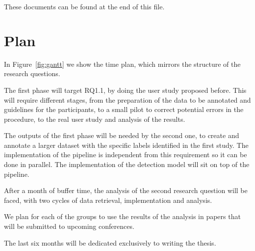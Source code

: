 These documents can be found at the end of this file.






\section{Plan}


In Figure~\ref{fig:gantt} we show the time plan, which mirrors the structure of the research questions.

The first phase will target RQ1.1, by doing the user study proposed before. This will require different stages, from the preparation of the data to be annotated and guidelines for the participants, to a small pilot to correct potential errors in the procedure, to the real user study and analysis of the results.

The outputs of the first phase will be needed by the second one, to create and annotate a larger dataset with the specific labels identified in the first study. The implementation of the pipeline is independent from this requirement so it can be done in parallel. The implementation of the detection model will sit on top of the pipeline.

After a month of buffer time, the analysis of the second research question will be faced, with two cycles of data retrieval, implementation and analysis.

We plan for each of the groups to use the results of the analysis in papers that will be submitted to upcoming conferences.

The last six months will be dedicated exclusively to writing the thesis.

